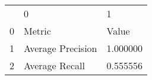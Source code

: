 \begin{tabular}{lll}
 & 0 & 1 \\
0 & Metric & Value \\
1 & Average Precision & 1.000000 \\
2 & Average Recall & 0.555556 \\
\end{tabular}
